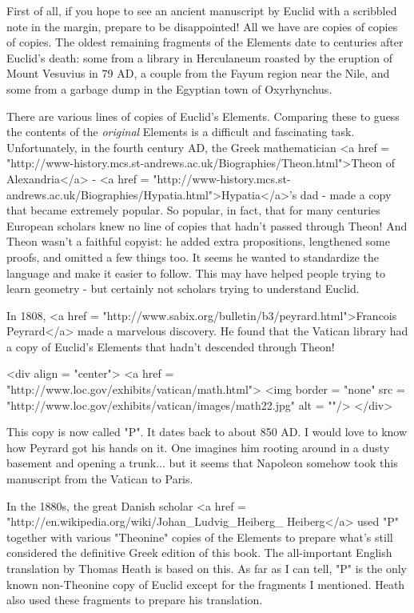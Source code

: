 First of all, if you hope to see an ancient manuscript by Euclid with 
a scribbled note in the margin, prepare to be disappointed!  All we 
have are copies of copies of copies.  The oldest remaining fragments 
of the Elements date to centuries after Euclid's death: some from a 
library in Herculaneum roasted by the eruption of Mount Vesuvius in 79 
AD, a couple from the Fayum region near the Nile, and some from a 
garbage dump in the Egyptian town of Oxyrhynchus.  

There are various lines of copies of Euclid's Elements.  Comparing
these to guess the contents of the \emph{original} Elements is a
difficult and fascinating task.  Unfortunately, in the fourth century
AD, the Greek mathematician <a href =
"http://www-history.mcs.st-andrews.ac.uk/Biographies/Theon.html">Theon
of Alexandria</a> - <a href = "http://www-history.mcs.st-andrews.ac.uk/Biographies/Hypatia.html">Hypatia</a>'s dad - made a copy that became extremely
popular.  So popular, in fact, that for many centuries European
scholars knew no line of copies that hadn't passed through Theon!  And
Theon wasn't a faithful copyist: he added extra propositions,
lengthened some proofs, and omitted a few things too.  It seems he
wanted to standardize the language and make it easier to follow.  This
may have helped people trying to learn geometry - but certainly not
scholars trying to understand Euclid.

In 1808, <a href =
"http://www.sabix.org/bulletin/b3/peyrard.html">Francois Peyrard</a> made
a marvelous discovery.  He found that the Vatican library had a copy
of Euclid's Elements that hadn't descended through Theon!  

<div align = "center">
<a href = "http://www.loc.gov/exhibits/vatican/math.html">
<img border = "none" src = "http://www.loc.gov/exhibits/vatican/images/math22.jpg" alt = ""/>
</div>

This copy
is now called "P".  It dates back to about 850 AD.  I would
love to know how Peyrard got his hands on it.  One imagines him
rooting around in a dusty basement and opening a trunk... but it seems
that Napoleon somehow took this manuscript from the Vatican to Paris.

In the 1880s, the great Danish scholar <a href =
"http://en.wikipedia.org/wiki/Johan_Ludvig_Heiberg_%
Heiberg</a> used "P" together with various
"Theonine" copies of the Elements to prepare what's still
considered the definitive Greek edition of this book.  The
all-important English translation by Thomas Heath is based on this.
As far as I can tell, "P" is the only known non-Theonine
copy of Euclid except for the fragments I mentioned.  Heath also used
these fragments to prepare his translation.

